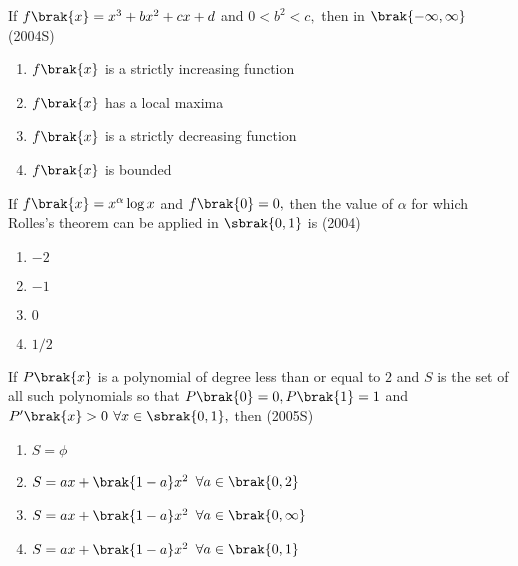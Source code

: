 \iffalse
 \title{16.Applications of Derivatives}
 \author{EE24btech11058-P.Shiny Diavajna}
 \section{mcq-single}
\fi                  

      \item
	      If $f\brak{x}=x^3+bx^2+cx+d$ and $0<b^2<c,$ then in $\brak{-\infty,\infty}$ \hfill(2004S)
        \begin{enumerate}
	 \item $f\brak{x}$ is a strictly increasing function
	 \item $f\brak{x}$ has a local maxima
	 \item $f\brak{x}$ is a strictly decreasing function
	 \item $f\brak{x}$ is bounded  \\
        \end{enumerate}
    
 
       \item
	       If $f\brak{x}=x^{\alpha} \log x$ and $f\brak{0}=0,$ then the value of $\alpha$ for which Rolles's theorem can be applied in $\sbrak{0,1}$ is 
		    \hfill(2004) 
        \begin {enumerate}
         \item $-2$
         \item $-1$
         \item $0$
         \item $1/2$\\
        \end{enumerate}
   
    
     \item
	     If $P\brak{x}$ is a polynomial of degree less than or equal to $2$ and $S$ is the set of all such polynomials so that $P\brak{0}=0,P\brak{1}=1$ and $P^{\prime}\brak{x}>0$ $\forall x \in \sbrak{0,1},$ then
     \hfill(2005S)
    \begin{enumerate}
        \item  $S=\phi$
	\item  $S=ax+\brak{1-a}x^{2}$ $\forall a \in \brak{0,2}$
	\item  $S=ax+\brak{1-a}x^{2}$ $\forall a\in \brak{0,\infty}$
	\item  $S=ax+\brak{1-a}x^{2}$ $\forall a \in \brak{0,1}$ \\
    \end{enumerate} 
    
